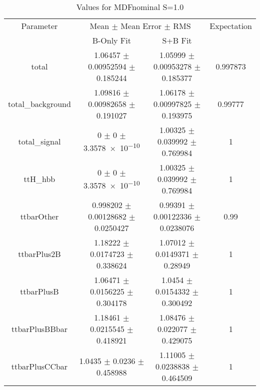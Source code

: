 \begin{table}
\centering
\caption{Values for MDFnominal S=1.0}
\begin{tabular}{cccc}
\toprule
Parameter & \multicolumn{2}{c}{Mean $\pm$ Mean Error $\pm$ RMS} & Expectation\\
 & B-Only Fit & S+B Fit & \\
\midrule
total & \num{1.06457} $\pm$ \num{0.00952594} $\pm$ \num{0.185244} & \num{1.05999} $\pm$ \num{0.00953278} $\pm$ \num{0.185377} & \num{0.997873}\\
total\_background & \num{1.09816} $\pm$ \num{0.00982658} $\pm$ \num{0.191027} & \num{1.06178} $\pm$ \num{0.00997825} $\pm$ \num{0.193975} & \num{0.99777}\\
total\_signal & \num{0} $\pm$ \num{0} $\pm$ \num{3.3578e-10} & \num{1.00325} $\pm$ \num{0.039992} $\pm$ \num{0.769984} & \num{1}\\
ttH\_hbb & \num{0} $\pm$ \num{0} $\pm$ \num{3.3578e-10} & \num{1.00325} $\pm$ \num{0.039992} $\pm$ \num{0.769984} & \num{1}\\
ttbarOther & \num{0.998202} $\pm$ \num{0.00128682} $\pm$ \num{0.0250427} & \num{0.99391} $\pm$ \num{0.00122336} $\pm$ \num{0.0238076} & \num{0.99}\\
ttbarPlus2B & \num{1.18222} $\pm$ \num{0.0174723} $\pm$ \num{0.338624} & \num{1.07012} $\pm$ \num{0.0149371} $\pm$ \num{0.28949} & \num{1}\\
ttbarPlusB & \num{1.06471} $\pm$ \num{0.0156225} $\pm$ \num{0.304178} & \num{1.0454} $\pm$ \num{0.0154332} $\pm$ \num{0.300492} & \num{1}\\
ttbarPlusBBbar & \num{1.18461} $\pm$ \num{0.0215545} $\pm$ \num{0.418921} & \num{1.08476} $\pm$ \num{0.022077} $\pm$ \num{0.429075} & \num{1}\\
ttbarPlusCCbar & \num{1.0435} $\pm$ \num{0.0236} $\pm$ \num{0.458988} & \num{1.11005} $\pm$ \num{0.0238838} $\pm$ \num{0.464509} & \num{1}\\
\bottomrule
\end{tabular}
\end{table}